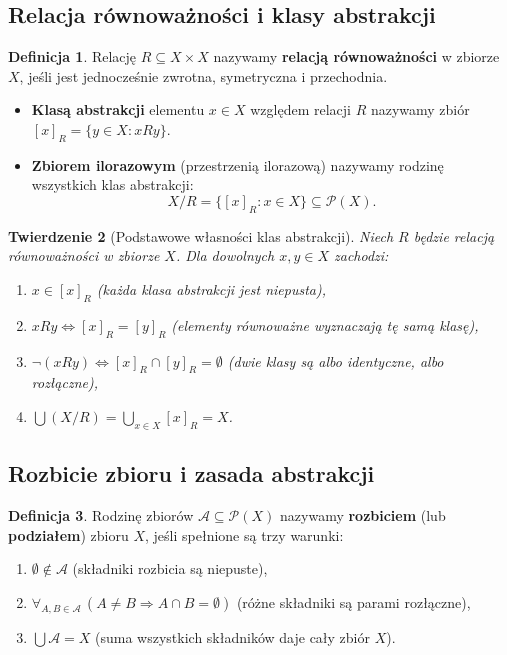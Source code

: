 \documentclass[11pt, a4paper]{article}
\theoremstyle{definition}
\newtheorem{definicja}{Definicja}[section]
\theoremstyle{plain}
\newtheorem{twierdzenie}[definicja]{Twierdzenie}
\theoremstyle{remark}
\begin{document}
\subsection{Relacja równoważności i klasy abstrakcji}

\begin{definicja}
Relację $R \subseteq X \times X$ nazywamy \textbf{relacją równoważności} w zbiorze $X$, jeśli jest jednocześnie zwrotna, symetryczna i przechodnia.
\begin{itemize}
    \item \textbf{Klasą abstrakcji} elementu $x \in X$ względem relacji $R$ nazywamy zbiór $[x]_R = \{y \in X : x R y\}$.
    \item \textbf{Zbiorem ilorazowym} (przestrzenią ilorazową) nazywamy rodzinę wszystkich klas abstrakcji:
    \[
        X / R = \{[x]_R : x \in X\} \subseteq \mathcal{P}(X).
    \]
\end{itemize}
\end{definicja}

\begin{twierdzenie}[Podstawowe własności klas abstrakcji]
Niech $R$ będzie relacją równoważności w zbiorze $X$. Dla dowolnych $x, y \in X$ zachodzi:
\begin{enumerate}
    \item $x \in [x]_R$ (każda klasa abstrakcji jest niepusta),
    \item $x R y \iff [x]_R = [y]_R$ (elementy równoważne wyznaczają tę samą klasę),
    \item $\neg(x R y) \iff [x]_R \cap [y]_R = \emptyset$ (dwie klasy są albo identyczne, albo rozłączne),
    \item $\bigcup (X / R) = \bigcup_{x \in X} [x]_R = X$.
\end{enumerate}
\end{twierdzenie}

\subsection{Rozbicie zbioru i zasada abstrakcji}

\begin{definicja}
Rodzinę zbiorów $\mathcal{A} \subseteq \mathcal{P}(X)$ nazywamy \textbf{rozbiciem} (lub \textbf{podziałem}) zbioru $X$, jeśli spełnione są trzy warunki:
\begin{enumerate}
    \item $\emptyset \notin \mathcal{A}$ (składniki rozbicia są niepuste),
    \item $\forall_{A, B \in \mathcal{A}}\, (A \neq B \Rightarrow A \cap B = \emptyset)$ (różne składniki są parami rozłączne),
    \item $\bigcup \mathcal{A} = X$ (suma wszystkich składników daje cały zbiór $X$).
\end{enumerate}
\end{definicja}
\end{document}
